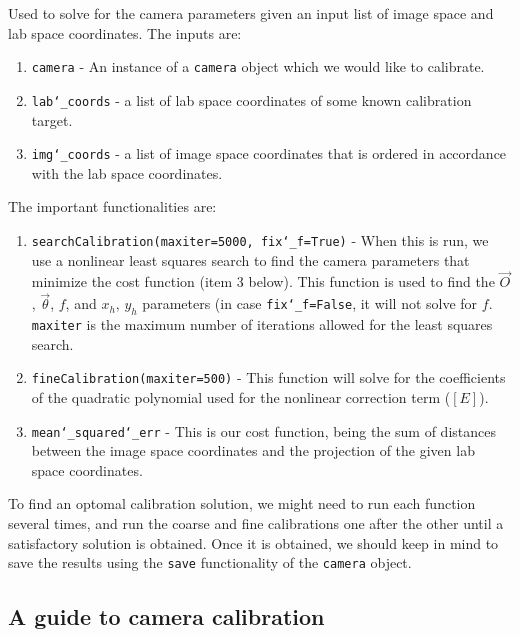 \documentclass[10pt,a4paper]{article}
\begin{document}
Used to solve for the camera parameters given an input list of image space and lab space coordinates. The inputs are:

\begin{enumerate}
	\item \texttt{camera} - An instance of a \texttt{camera} object which we would like to calibrate.
	\item \texttt{lab\char`_coords} - a list of lab space coordinates of some known calibration target. 
	\item \texttt{img\char`_coords} - a list of image space coordinates that is ordered in accordance with the lab space coordinates. 
\end{enumerate}



The important functionalities are:
%
\begin{enumerate}
	
	\item \texttt{searchCalibration(maxiter=5000, fix\char`_f=True)} - When this is run, we use a nonlinear least squares search to find the camera parameters that minimize the cost function (item 3 below). This function is used to find the $\vec{O}$, $\vec{\theta}$, $f$, and $x_h, \, y_h$ parameters (in case \texttt{fix\char`_f=False}, it will not solve for $f$. \texttt{maxiter} is the maximum number of iterations allowed for the least squares search.
	
	\item \texttt{fineCalibration(maxiter=500)} - This function will solve for the coefficients of the quadratic polynomial used for the nonlinear correction term ($[E]$). 
	
	\item \texttt{mean\char`_squared\char`_err} - This is our cost function, being the sum of distances between the image space coordinates and the projection of the given lab space coordinates.
	
\end{enumerate}
%
To find an optomal calibration solution, we might need to run each function several times, and run the coarse and fine calibrations one after the other until a satisfactory solution is obtained. Once it is obtained, we should keep in mind to save the results using the \texttt{save} functionality of the \texttt{camera} object. 








\subsection{A guide to camera calibration}
\end{document}
